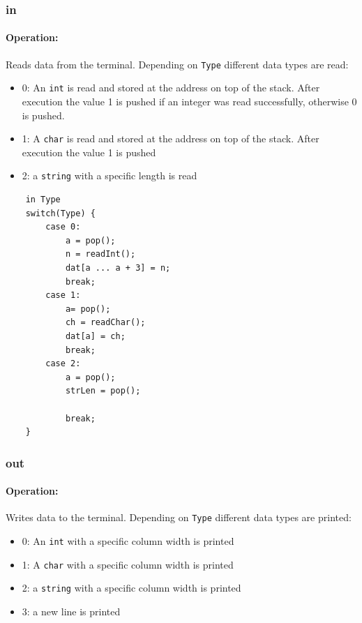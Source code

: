 \subsubsection{in}\label{sec:in}

\paragraph{Operation:}
Reads data from the terminal. Depending on \lstinline$Type$ different data types are read:

\begin{itemize}
	\item 0: An \lstinline$int$ is read and stored at the address on top of the stack. After execution the value 1 is pushed if an integer was read successfully, otherwise 0 is pushed.
	\item 1: A \lstinline$char$ is read and stored at the address on top of the stack. After execution the value 1 is pushed 
	\item 2: a \lstinline$string$ with a specific length is read
\end{itemize}

	\begin{lstlisting}
	in Type
	switch(Type) {
		case 0:
			a = pop();
			n = readInt();
			dat[a ... a + 3] = n;
			break;
		case 1:
			a= pop();
			ch = readChar();
			dat[a] = ch;
			break;
		case 2:
			a = pop();
			strLen = pop();
			
			break;
	}
	\end{lstlisting}

\subsubsection{out}\label{sec:out}

\paragraph{Operation:}
Writes data to the terminal. Depending on \lstinline$Type$ different data types are printed:

\begin{itemize}
	\item 0: An \lstinline$int$ with a specific column width is printed
	\item 1: A \lstinline$char$ with a specific column width is printed
	\item 2: a \lstinline$string$ with a specific column width is printed
	\item 3: a new line is printed
\end{itemize}

